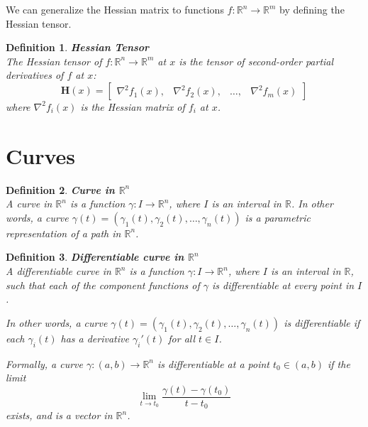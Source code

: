 \documentclass[11pt]{book} %
\newtheorem{definition}{Definition}[section]
\begin{document}
We can generalize the Hessian matrix to functions $f: \mathbb{R}^n \rightarrow \mathbb{R}^m$ by defining the Hessian tensor.
\begin{definition}{\textbf{Hessian Tensor}} \\
    The Hessian tensor of $f: \mathbb{R}^n \rightarrow \mathbb{R}^m$ at $x$ is the tensor of second-order partial derivatives of $f$ at $x$:
    \begin{equation}
        \mathbf{H}(x) = \begin{bmatrix}
        \nabla^2 f_1(x), &\nabla^2 f_2(x), &\ldots, &\nabla^2 f_m(x)
        \end{bmatrix}
    \end{equation}
    where $\nabla^2 f_i(x)$ is the Hessian matrix of $f_i$ at $x$.
\end{definition}


\section{Curves}

\begin{definition}{\textbf{Curve in \( \mathbb{R}^n \)}} \\
    A curve in \( \mathbb{R}^n \) is a function \( \gamma: I \to \mathbb{R}^n \), where \( I \) is an interval in \( \mathbb{R} \).
    In other words, a curve \( \gamma(t) = (\gamma_1(t), \gamma_2(t), \ldots, \gamma_n(t)) \) is a parametric representation of a path in \( \mathbb{R}^n \).
\end{definition}

\begin{definition}{\textbf{Differentiable curve in \( \mathbb{R}^n \)}} \\ 

    A differentiable curve in \( \mathbb{R}^n \) is a function \( \gamma: I \to \mathbb{R}^n \), where \( I \) is an interval in \( \mathbb{R} \), 
    such that each of the component functions of \( \gamma \) is differentiable at every point in \( I \). 

    In other words, a curve \( \gamma(t) = (\gamma_1(t), \gamma_2(t), \ldots, \gamma_n(t)) \) is differentiable 
    if each \( \gamma_i(t) \) has a derivative \( \gamma_i'(t) \) for all \( t \in I \).

    Formally, a curve \( \gamma: (a, b) \to \mathbb{R}^n \) is differentiable at a point \( t_0 \in (a, b) \) if the limit
    \[
    \lim_{t \to t_0} \frac{\gamma(t) - \gamma(t_0)}{t - t_0}
    \]
    exists, and is a vector in \( \mathbb{R}^n \). 
\end{definition}
\end{document}
